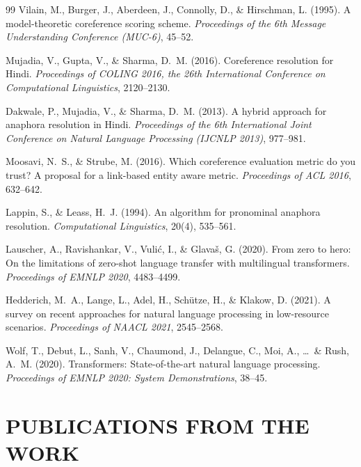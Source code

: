\documentclass[12pt,a4paper]{report}
\begin{document}
\begin{thebibliography}{99}
Vilain, M., Burger, J., Aberdeen, J., Connolly, D., \& Hirschman, L. (1995).
A model-theoretic coreference scoring scheme.
\textit{Proceedings of the 6th Message Understanding Conference (MUC-6)}, 45--52.

Mujadia, V., Gupta, V., \& Sharma, D.\ M. (2016).
Coreference resolution for Hindi.
\textit{Proceedings of COLING 2016, the 26th International Conference on Computational Linguistics}, 2120--2130.

Dakwale, P., Mujadia, V., \& Sharma, D.\ M. (2013).
A hybrid approach for anaphora resolution in Hindi.
\textit{Proceedings of the 6th International Joint Conference on Natural Language Processing (IJCNLP 2013)}, 977--981.

Moosavi, N.\ S., \& Strube, M. (2016).
Which coreference evaluation metric do you trust? A proposal for a link-based entity aware metric.
\textit{Proceedings of ACL 2016}, 632--642.

Lappin, S., \& Leass, H.\ J. (1994).
An algorithm for pronominal anaphora resolution.
\textit{Computational Linguistics}, 20(4), 535--561.

Lauscher, A., Ravishankar, V., Vuli\'{c}, I., \& Glava\v{s}, G. (2020).
From zero to hero: On the limitations of zero-shot language transfer with multilingual transformers.
\textit{Proceedings of EMNLP 2020}, 4483--4499.

Hedderich, M.\ A., Lange, L., Adel, H., Sch\"{u}tze, H., \& Klakow, D. (2021).
A survey on recent approaches for natural language processing in low-resource scenarios.
\textit{Proceedings of NAACL 2021}, 2545--2568.

Wolf, T., Debut, L., Sanh, V., Chaumond, J., Delangue, C., Moi, A., \ldots\ \& Rush, A.\ M. (2020).
Transformers: State-of-the-art natural language processing.
\textit{Proceedings of EMNLP 2020: System Demonstrations}, 38--45.

\end{thebibliography}

\chapter*{PUBLICATIONS FROM THE WORK}
\end{document}
